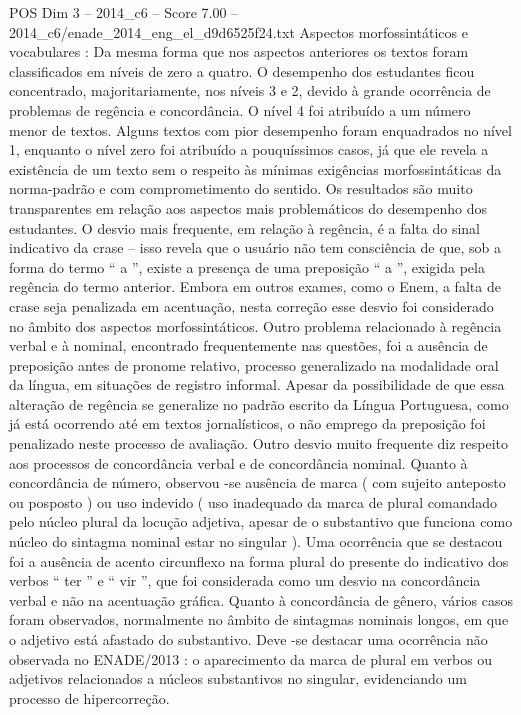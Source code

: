 \begin{textsample}{POS Dim 3 – 2014\_c6 – Score 7.00 – 2014\_c6/enade\_2014\_eng\_el\_d9d6525f24.txt}
Aspectos morfossintáticos e vocabulares : Da mesma forma que nos aspectos anteriores os textos foram classificados em níveis de zero a quatro.
O desempenho dos estudantes ficou concentrado, majoritariamente, nos níveis 3 e 2, devido à grande ocorrência de problemas de regência e concordância.
O nível 4 foi atribuído a um número menor de textos.
Alguns textos com pior desempenho foram enquadrados no nível 1, enquanto o nível zero foi atribuído a pouquíssimos casos, já que ele revela a existência de um texto sem o respeito às mínimas exigências morfossintáticas da norma-padrão e com comprometimento do sentido.
Os resultados são muito transparentes em relação aos aspectos mais problemáticos do desempenho dos estudantes.
O desvio mais frequente, em relação à regência, é a falta do sinal indicativo da crase – isso revela que o usuário não tem consciência de que, sob a forma do termo “ a ”, existe a presença de uma preposição “ a ”, exigida pela regência do termo anterior.
Embora em outros exames, como o Enem, a falta de crase seja penalizada em acentuação, nesta correção esse desvio foi considerado no âmbito dos aspectos morfossintáticos.
Outro problema relacionado à regência verbal e à nominal, encontrado frequentemente nas questões, foi a ausência de preposição antes de pronome relativo, processo generalizado na modalidade oral da língua, em situações de registro informal.
Apesar da possibilidade de que essa alteração de regência se generalize no padrão escrito da Língua Portuguesa, como já está ocorrendo até em textos jornalísticos, o não emprego da preposição foi penalizado neste processo de avaliação.
Outro desvio muito frequente diz respeito aos processos de concordância verbal e de concordância nominal.
Quanto à concordância de número, observou -se ausência de marca ( com sujeito anteposto ou posposto ) ou uso indevido ( uso inadequado da marca de plural comandado pelo núcleo plural da locução adjetiva, apesar de o substantivo que funciona como núcleo do sintagma nominal estar no singular ).
Uma ocorrência que se destacou foi a ausência de acento circunflexo na forma plural do presente do indicativo dos verbos “ ter ” e “ vir ”, que foi considerada como um desvio na concordância verbal e não na acentuação gráfica.
Quanto à concordância de gênero, vários casos foram observados, normalmente no âmbito de sintagmas nominais longos, em que o adjetivo está afastado do substantivo.
Deve -se destacar uma ocorrência não observada no ENADE/2013 : o aparecimento da marca de plural em verbos ou adjetivos relacionados a núcleos substantivos no singular, evidenciando um processo de hipercorreção.

\end{textsample}

